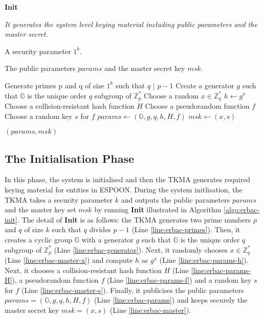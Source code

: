 \documentclass[epsfig,a4paper,11pt,titlepage]{book}
\numberwithin{algorithm}{chapter}
\newcommand{\algofontsize}{\fontsize{11}{12}\selectfont}
\begin{document}
\begin{algorithm} [htp]
{\algofontsize
\caption{\textbf{Init}}

\label{algo:erbac-init}

\begin{algorithmic}[1]

\INPUT \emph{It generates the system level keying material including public parameters and the master secret.}

\Require A security parameter $1^k$.

\Ensure The public parameters $params$ and the master secret key $msk$.

\medskip

\State Generate primes p and q of size $1^k$ such that $q$ $|$ $p - 1$ \label{line:erbac-primes}
\State Create a generator $g$ such that $\mathbb{G}$ is the unique order $q$ subgroup of $\mathbb{Z}^*_p$ \label{line:erbac-generator}
\State Choose a random $x \in \mathbb{Z}^*_q$ \label{line:erbac-master-x}
\State $h \leftarrow g^x$ \label{line:erbac-params-h}
\State Choose a collision-resistant hash function $H$ \label{line:erbac-params-H}
\State Choose a pseudorandom function $f$ \label{line:erbac-params-f}
\State Choose a random key $s$ for $f$ \label{line:erbac-master-s}
\State $params \leftarrow (\mathbb{G}, g, q, h, H, f)$ \label{line:erbac-params}
\State $msk \leftarrow (x, s)$ \label{line:erbac-master}

\Return $(params, msk)$

\end{algorithmic}
}
\end{algorithm}


\subsection{The Initialisation Phase}

In this phase, the system is initialised and then the \gls{TKMA} generates required keying material for entities in \gls{ESPOON}. During the system initlisation, the \gls{TKMA} takes a security parameter $k$ and outputs the public parameters $params$ and the master key set $msk$ by running \textbf{Init} illustrated in Algorithm \ref{algo:erbac-init}. The detail of \textbf{Init} is as follows: the \gls{TKMA} generates two prime numbers $p$ and $q$ of size $k$ such that $q$ divides $p-1$ (Line \ref{line:erbac-primes}). Then, it creates a cyclic group $\mathbb{G}$ with a generator $g$ such that $\mathbb{G}$ is the unique order $q$ subgroup of $\mathbb{Z}^*_p$ (Line \ref{line:erbac-generator}). Next, it randomly chooses $x \in \mathbb{Z}^*_q$ (Line \ref{line:erbac-master-x}) and compute $h$ as $g^x$ (Line \ref{line:erbac-params-h}). Next, it chooses a collision-resistant hash function $H$ (Line \ref{line:erbac-params-H}), a pseudorandom function $f$ (Line \ref{line:erbac-params-f}) and a random key $s$ for $f$ (Line \ref{line:erbac-master-s}). Finally, it publicises the public parameters $params = (\mathbb{G}, g, q, h, H, f)$ (Line \ref{line:erbac-params}) and keeps securely the master secret key $msk = (x, s)$ (Line \ref{line:erbac-master}).
\end{document}
